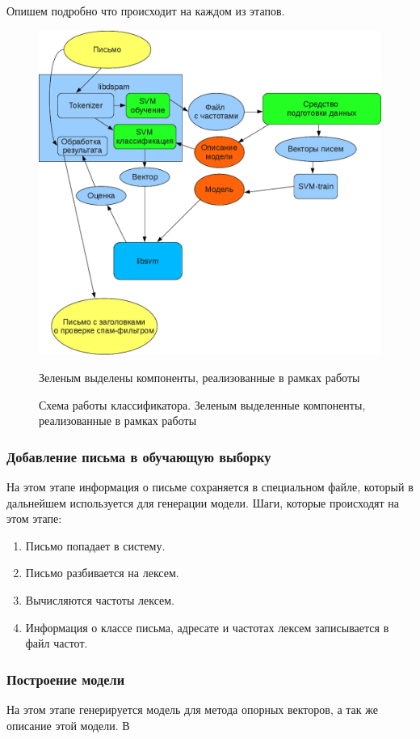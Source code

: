 Опишем подробно что происходит на каждом из этапов.

\begin{figure}[h]
\begin{center}
\includegraphics[width=12cm]{img/working_scheme2}
\end{center}
Зеленым выделены компоненты, реализованные в рамках работы\caption{Схема работы классификатора. Зеленым выделенные компоненты, реализованные в рамках работы}
\label{dspamarch}
\end{figure}

\subsubsection{Добавление письма в обучающую выборку}

На этом этапе информация о письме сохраняется в специальном файле, который в дальнейшем используется для генерации модели.
Шаги, которые происходят на этом этапе:
\begin{enumerate}
    \item Письмо попадает в систему.
    \item Письмо разбивается на лексем.
    \item Вычисляются частоты лексем.
    \item Информация о классе письма, адресате и частотах лексем записывается в файл частот.
\end{enumerate}

\subsubsection{Построение модели}
На этом этапе генерируется модель для метода опорных векторов, а так же описание этой модели. В

